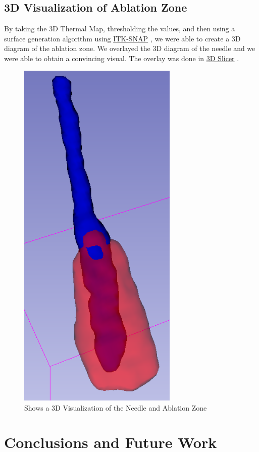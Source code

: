 \documentclass[]{spie}  %
\begin{document}
\subsection{3D Visualization of Ablation Zone}

By taking the 3D Thermal Map, thresholding the values, and then using a surface generation algorithm using \href{www.itksnap.org}{ITK-SNAP} \cite{Yushkevich06}, we were able to create a 3D diagram of the ablation zone. We overlayed the 3D diagram of the needle and we were able to obtain a convincing visual. The overlay was done in \href{http://www.slicer.org/}{3D Slicer} \cite{Fedorov12}. 

\begin{figure} 
\centering 
\includegraphics[width=3in]{NeedleAndAblationZone.png} 
\caption{Shows a 3D Visualization of the Needle and Ablation Zone} 
\end{figure}

\section{Conclusions and Future Work}
\end{document}
